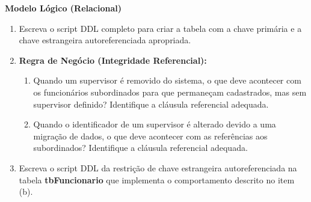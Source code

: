 \documentclass[12pt,a4paper]{article}
\newcommand{\resposta}[1]{}
\begin{document}
\begin{center}
    \textbf{Modelo Lógico (Relacional)} \\[0.2cm]

\end{center}

\begin{enumerate}[label=\textbf{\alph*)}]
    
    \item Escreva o script DDL completo para criar a tabela com a chave primária e a chave estrangeira autoreferenciada apropriada.
    \resposta{4cm}
    
    \item \textbf{Regra de Negócio (Integridade Referencial):}
    \begin{enumerate}[label=\arabic*.]
        \item Quando um supervisor é removido do sistema, o que deve acontecer com os funcionários subordinados para que permaneçam cadastrados, mas sem supervisor definido? Identifique a cláusula referencial adequada.
        
        \item Quando o identificador de um supervisor é alterado devido a uma migração de dados, o que deve acontecer com as referências aos subordinados? Identifique a cláusula referencial adequada.
    \end{enumerate}
    \resposta{3cm}
    
    \item Escreva o script DDL da restrição de chave estrangeira autoreferenciada na tabela \textbf{tbFuncionario} que implementa o comportamento descrito no item (b).
    \resposta{3cm}

\end{enumerate}
\end{document}
